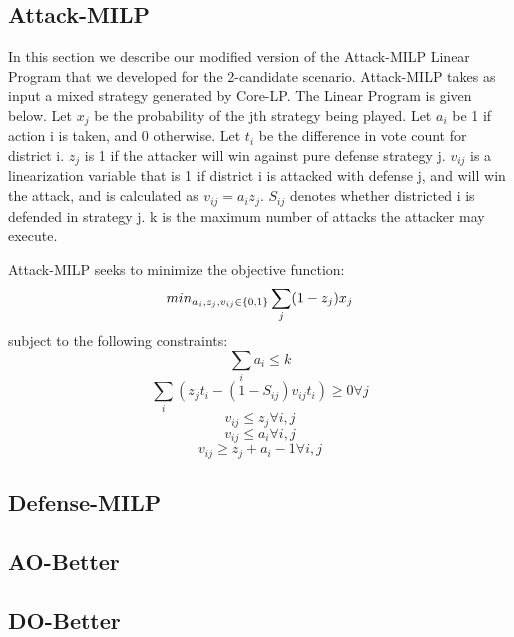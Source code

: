 \documentclass[letterpaper]{article} %
\begin{document}
\subsection{Attack-MILP}
In this section we describe our modified version of the Attack-MILP Linear Program that we developed for the 2-candidate scenario. Attack-MILP takes as input a mixed strategy generated by Core-LP. The Linear Program is given below.
Let $x_j$ be the probability of the jth strategy being played. Let $a_i$ be 1 if action i is taken, and 0 otherwise. Let $t_i$ be the difference in vote count for district i. $z_j$ is 1 if the attacker will win against pure defense strategy j. $v_{ij}$ is a linearization variable that is 1 if district i is attacked with defense j, and will win the attack, and is calculated as $v_{ij} = a_iz_j$. $S_{ij}$ denotes whether districted i is defended in strategy j. k is the maximum number of attacks the attacker may execute. 

Attack-MILP seeks to minimize the objective function:
\begin{equation}
min_{a_i,z_j,v_{ij} \in \{0,1\}}\sum_{j}(1-z_{j})x_j \\
\end{equation}
subject to the following constraints:
\begin{equation}
\sum_{i}a_{i} \leq k
\end{equation}
\begin{equation}
\sum_{i}(z_jt_i-(1-S_{ij})v_{ij}t_i) \geq 0 \forall j
\end{equation}
\begin{equation}
v_{ij} \leq z_j \forall i,j
\end{equation}
\begin{equation}
v_{ij} \leq a_i \forall i,j
\end{equation}
\begin{equation}
v_{ij} \geq z_j+a_i-1 \forall i,j
\end{equation}


\subsection{Defense-MILP}
\subsection{AO-Better}
\subsection{DO-Better}
\end{document}
